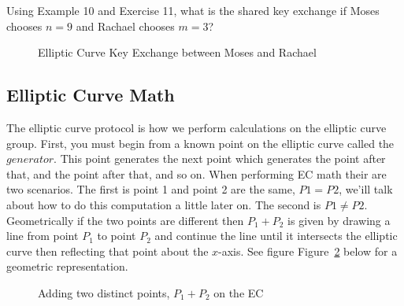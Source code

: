 \begin{exer}
Using Example 10 and Exercise 11, what is the shared key exchange if Moses chooses $n = 9$ and Rachael chooses $m = 3$?
\end{exer}
\begin{figure}[H]
	  \caption{\label{fig:DH:DHKE_8} Elliptic Curve Key Exchange between Moses and Rachael }
\end{figure}


\subsection{Elliptic Curve Math}
The elliptic curve protocol is how we perform calculations on the elliptic curve group. First, you must begin from a known point on the elliptic curve called the $generator$.  This point generates the next point which generates the point after that, and the point after that, and so on.  When performing EC math their are two scenarios.  The first is point 1 and point 2 are the same, $P1 = P2$, we'ill talk about how to do this computation a little later on. The second is $P1 \neq P2$. Geometrically if the two points are different then $P_1 + P_2$ is given by drawing a line from point $P_1$ to point $P_2$ and continue the line until it intersects the elliptic curve then reflecting that point about the $x$-axis.  See figure Figure~\ref{fig:DH:DHKE_6} below for a geometric representation.

\begin{figure}[H]
	  \caption{\label{fig:DH:DHKE_6} Adding  two distinct points, $P_1 + P_2$ on the EC}
\end{figure}


